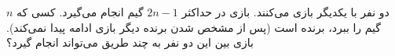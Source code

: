 \EXERCISE
دو نفر با یکدیگر بازی می‌کنند. بازی در حداکثر
$2n - 1$
گیم انجام می‌گیرد. کسی که
$n$
گیم را ببرد، برنده است (پس از مشخص شدن برنده دیگر بازی ادامه پیدا نمی‌کند). بازی بین این دو نفر به چند طریق می‌تواند انجام گیرد؟